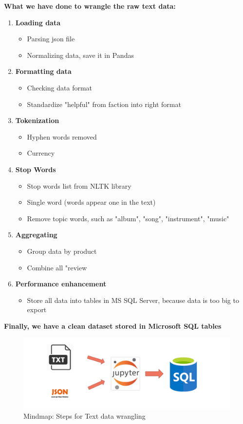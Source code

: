 \documentclass[a4paper,11pt]{article}
\begin{document}
		\textbf{What we have done to wrangle the raw text data:}
		\begin{enumerate}
			\item \textbf{Loading data}
				\begin{itemize}
					\item Parsing json file
					\item Normalizing data, save it in Pandas
				\end{itemize}
			\item \textbf{Formatting data}
				\begin{itemize}
					\item Checking data format
					\item Standardize "helpful" from faction into right format
				\end{itemize}
			\item \textbf{Tokenization}
				\begin{itemize}
					\item Hyphen words removed
					\item Currency %
				\end{itemize}
			\item \textbf{Stop Words}
				\begin{itemize}
					\item Stop words list from NLTK library
					\item Single word (words appear one in the text)
					\item Remove topic words, such as "album", "song", "instrument", "music"
				\end{itemize}
			\item \textbf{Aggregating}
				\begin{itemize}
					\item Group data by product%
					\item Combine all "review%
				\end{itemize}
			\item \textbf{Performance enhancement}
				\begin{itemize}
					\item Store all data into tables in MS SQL Server, because data is too big to export
				\end{itemize}
		\end{enumerate}				
		
		\textbf{Finally, we have a clean dataset stored in Microsoft SQL tables}
		\begin{figure}[H]
			\includegraphics[width=1\textwidth, center]{pic5}
			\caption{Mindmap: Steps for Text data wrangling}
		\end{figure}
		
\end{document}
